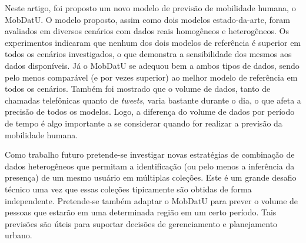 \documentclass[10pt, a4paper, onecolumn, conference, compsocconf]{IEEEtran}
\begin{document}
Neste artigo, foi proposto um novo modelo de previsão de mobilidade humana, o MobDatU. O modelo proposto, assim como dois modelos estado-da-arte, foram avaliados em diversos cenários com dados reais homogêneos e heterogêneos. Os experimentos indicaram que nenhum dos dois modelos de referência é superior em todos os cenários investigados, o que demonstra a sensibilidade dos mesmos aos dados disponíveis. Já o MobDatU se adequou bem a ambos tipos de dados, sendo  pelo menos comparável (e por vezes superior) ao melhor modelo de referência em todos os cenários. Também foi mostrado que o volume de dados, tanto de chamadas telefônicas quanto de {\it tweets}, varia bastante durante o dia, o que afeta a precisão de todos os modelos. Logo, a diferença do volume de dados por período de tempo é algo importante a se considerar quando for realizar a previsão da mobilidade humana.

Como trabalho futuro pretende-se investigar novas estratégias de combinação de dados heterogêneos que permitam a identificação (ou pelo menos a inferência da presença) de um mesmo usuário em múltiplas coleções. Este
é um grande desafio técnico uma vez que essas coleções tipicamente são obtidas de forma independente. Pretende-se também adaptar o MobDatU para prever o volume de pessoas que estarão em uma determinada região em um certo período. Tais previsões são úteis para suportar decisões de gerenciamento e planejamento urbano.


%
%

\end{document}
